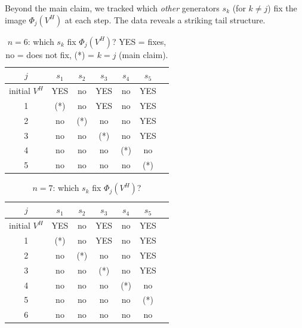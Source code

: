 \documentclass[12pt]{article}
\theoremstyle{definition}
\begin{document}
Beyond the main claim, we tracked which \emph{other} generators $s_k$ (for $k \ne j$) fix the image $\Phi_j(V^H)$ at each step. The data reveals a striking tail structure.

\begin{table}[h]
\centering
\caption{$n=6$: which $s_k$ fix $\Phi_j(V^H)$? YES = fixes, no = does not fix, (*) = $k=j$ (main claim).}
\begin{tabular}{c|cccccc}
\toprule
$j$ & $s_1$ & $s_2$ & $s_3$ & $s_4$ & $s_5$ \\
\midrule
initial $V^H$ & YES & no & YES & no & YES \\
\midrule
1 & (*) & no & YES & no & YES \\
2 & no  & (*) & no & no & YES \\
3 & no  & no  & (*) & no & YES \\
4 & no  & no  & no  & (*) & no \\
5 & no  & no  & no  & no  & (*) \\
\bottomrule
\end{tabular}
\end{table}

\begin{table}[h]
\centering
\caption{$n=7$: which $s_k$ fix $\Phi_j(V^H)$?}
\begin{tabular}{c|cccccc}
\toprule
$j$ & $s_1$ & $s_2$ & $s_3$ & $s_4$ & $s_5$ \\
\midrule
initial $V^H$ & YES & no & YES & no & YES \\
\midrule
1 & (*) & no & YES & no & YES \\
2 & no  & (*) & no & no & YES \\
3 & no  & no  & (*) & no & YES \\
4 & no  & no  & no  & (*) & no \\
5 & no  & no  & no  & no  & (*) \\
6 & no  & no  & no  & no  & no \\
\bottomrule
\end{tabular}
\end{table}
\end{document}
